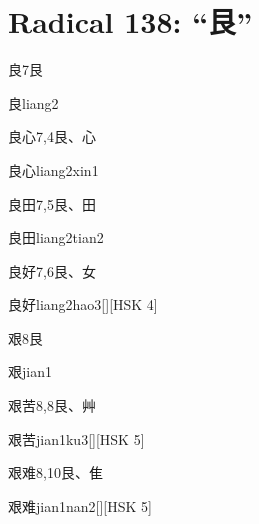 
\section*{Radical 138: ``⾉''}

\begin{entry}{良}{7}{⾉}
  \begin{phonetics}{良}{liang2}
  \end{phonetics}
\end{entry}

\begin{entry}{良心}{7,4}{⾉、⼼}
  \begin{phonetics}{良心}{liang2xin1}
  \end{phonetics}
\end{entry}

\begin{entry}{良田}{7,5}{⾉、⽥}
  \begin{phonetics}{良田}{liang2tian2}
  \end{phonetics}
\end{entry}

\begin{entry}{良好}{7,6}{⾉、⼥}
  \begin{phonetics}{良好}{liang2hao3}[][HSK 4]
  \end{phonetics}
\end{entry}

\begin{entry}{艰}{8}{⾉}
  \begin{phonetics}{艰}{jian1}
  \end{phonetics}
\end{entry}

\begin{entry}{艰苦}{8,8}{⾉、⾋}
  \begin{phonetics}{艰苦}{jian1ku3}[][HSK 5]
  \end{phonetics}
\end{entry}

\begin{entry}{艰难}{8,10}{⾉、⾫}
  \begin{phonetics}{艰难}{jian1nan2}[][HSK 5]
  \end{phonetics}
\end{entry}


